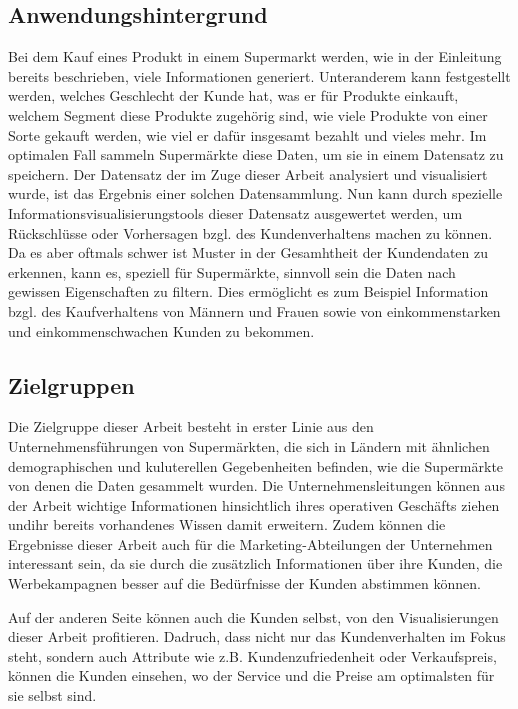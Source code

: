 \documentclass[usegeometry=true]{scrartcl}
\begin{document}
\subsection{Anwendungshintergrund}
Bei dem Kauf eines Produkt in einem Supermarkt werden, wie in der Einleitung bereits beschrieben, viele Informationen generiert. Unteranderem kann festgestellt werden,
welches Geschlecht der Kunde hat, was er für Produkte einkauft, welchem Segment diese Produkte zugehörig sind, wie viele Produkte von einer Sorte gekauft werden,
wie viel er dafür insgesamt bezahlt und vieles mehr. Im optimalen Fall sammeln Supermärkte diese Daten, um sie in einem Datensatz zu speichern.
Der Datensatz der im Zuge dieser Arbeit analysiert und visualisiert wurde, ist das Ergebnis einer solchen Datensammlung. Nun kann durch spezielle
Informationsvisualisierungstools dieser Datensatz ausgewertet werden, um Rückschlüsse oder Vorhersagen bzgl. des Kundenverhaltens machen zu können.
Da es aber oftmals schwer ist Muster in der Gesamhtheit der Kundendaten zu erkennen, kann es, speziell für Supermärkte, sinnvoll sein die Daten nach gewissen Eigenschaften zu
filtern. Dies ermöglicht es zum Beispiel Information bzgl. des Kaufverhaltens von Männern und Frauen sowie von einkommenstarken und einkommenschwachen Kunden zu bekommen.


\subsection{Zielgruppen}
Die Zielgruppe dieser Arbeit besteht in erster Linie aus den Unternehmensführungen von Supermärkten, die sich in Ländern mit ähnlichen demographischen und kuluterellen
Gegebenheiten befinden, wie die Supermärkte von denen die Daten gesammelt wurden. Die Unternehmensleitungen können aus der Arbeit wichtige Informationen hinsichtlich ihres
operativen Geschäfts ziehen undihr bereits vorhandenes Wissen damit erweitern. Zudem können die Ergebnisse dieser Arbeit auch für die Marketing-Abteilungen der Unternehmen
interessant sein, da sie durch die zusätzlich Informationen über ihre Kunden, die Werbekampagnen besser auf die Bedürfnisse der Kunden abstimmen können.

\noindent Auf der anderen Seite können auch die Kunden selbst, von den Visualisierungen dieser Arbeit profitieren. Dadruch, dass nicht nur das Kundenverhalten im Fokus steht,
sondern auch Attribute wie z.B. Kundenzufriedenheit oder Verkaufspreis, können die Kunden einsehen, wo der Service und die Preise am optimalsten für sie selbst sind.
\end{document}
